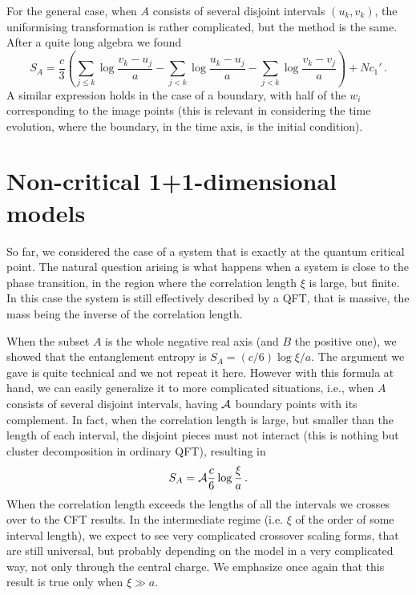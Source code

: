 \documentclass{ws-ijqi}
\def\be{\begin{equation}}
\def\ee{\end{equation}}
\begin{document}
For the general case, when $A$ consists of several disjoint intervals 
$(u_k,v_k)$, the uniformising transformation is rather 
complicated,\cite{cc-04} but the method is the same. 
After a quite long algebra we found
\be
\label{general}
S_A=\frac c3\left(\sum_{j\leq k}\log\frac{v_k-u_j}{a}
-\sum_{j<k}\log\frac{u_k-u_j}{a}-\sum_{j<k}\log\frac{v_k-v_j}{a}
\right)+Nc_1'\,.
\ee
A similar expression holds in the case of a boundary, with half of the
$w_i$ corresponding to the image points (this is relevant in considering
the time evolution,\cite{cc-05} where the boundary, in the time axis, is 
the initial condition). 



\section{Non-critical 1+1-dimensional models}
\label{noncrit}

So far, we considered the case of a system that is exactly at the 
quantum critical point. The natural question arising is what happens 
when a system is close to the phase transition, in the region where the 
correlation length $\xi$ is large, but finite. 
In this case the system is 
still effectively described by a QFT, that is massive, the mass being the
inverse of the correlation length.

When the subset $A$ is the whole negative real axis (and $B$ the positive 
one), we showed that the entanglement entropy is $S_A=(c/6) \log\xi/a$.
The argument we gave\cite{cc-04} is quite technical and we not 
repeat it here. 
However with this formula at hand, we can easily generalize it to more 
complicated situations, i.e., when $A$ consists of several disjoint 
intervals, having ${\cal A}$ boundary points with its complement. 
In fact, when the correlation length is large, but smaller than the length 
of each interval, the disjoint pieces must not interact (this is nothing but 
cluster decomposition in ordinary QFT), resulting in
\be
S_A={\cal A} \frac{c}{6}\log\frac{\xi}{a}\,.
\label{Snoncrit}
\ee 
When the correlation length exceeds the lengths of all the intervals we 
crosses over to the CFT results. In the intermediate regime (i.e. $\xi$ of 
the order of some interval length), we expect to see very complicated 
crossover scaling forms, that are still universal, but probably depending 
on the model in a very complicated way, not only through the central charge.
We emphasize once again that this result is true only when $\xi\gg a$.
\end{document}
